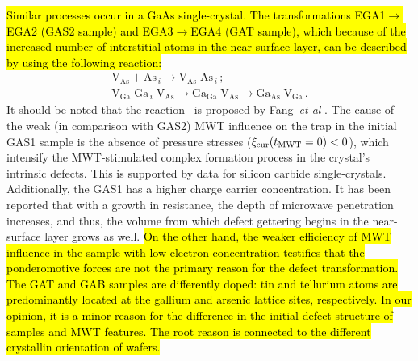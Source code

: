 \documentclass[10pt]{iopart}
\begin{document}
\hl{Similar processes occur in a GaAs single-crystal.
The transformations EGA1$\rightarrow$EGA2 (GAS2 sample)
and  EGA3$\rightarrow$EGA4 (GAT sample), which
because of the increased number of interstitial atoms in the near-surface layer,
can be described  by using the following reaction:}
\begin{eqnarray}
  \label{eqGA12}
  \mathrm{V}_\mathrm{As}+ \mathrm{As}_{\,i} \rightarrow \mathrm{V}_\mathrm{As}\;\mathrm{As}_{\,i}\,;\\
  \label{eqGA34}
  \mathrm{V}_\mathrm{Ga}\;\mathrm{Ga}_{\,i}\;\mathrm{V}_\mathrm{As}\rightarrow \mathrm{Ga}_\mathrm{Ga}\;\mathrm{V}_\mathrm{As}
  \rightarrow \mathrm{Ga}_\mathrm{As}\;\mathrm{V}_\mathrm{Ga}\,.
\end{eqnarray}
It should be noted that the reaction~ is proposed by Fang~\emph{et al} \cite{FANG1990}.
The cause of the weak (in comparison with GAS2) MWT influence on the trap in the initial GAS1 sample is
the absence of pressure stresses ($\xi_\mathrm{cur}(t_{\rm MWT}=0)<0$),
which intensify the MWT-stimulated complex formation process in the crystal’s intrinsic defects.
This is supported by data for silicon carbide single-crystals.
Additionally, the GAS1 has a higher charge carrier concentration.
It has been reported \cite{ZOHM2000} that with a growth in resistance, the depth of microwave penetration increases,
and thus, the volume from which defect gettering begins in the near-surface layer grows as well.
\hl{On the other hand, the weaker efficiency of MWT influence in the sample
with low electron concentration testifies that
the ponderomotive forces are not the primary reason for the defect transformation.
The GAT and GAB samples are differently doped:
tin and tellurium atoms are predominantly located at the gallium and arsenic lattice sites, respectively.
In our opinion, it is a minor reason for the difference in the initial defect structure of samples and MWT features.
The root reason is connected to the different crystallin orientation of wafers.}
\end{document}
